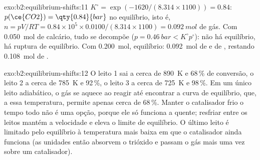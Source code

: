 \begin{solution}{exo:b2:equilibrium-shifts:11}
$K^\circ = \exp(-1620/(8.314 \times 1100)) = 0.84$: $p(\ce{CO2}) =
\qty{0.84}{bar}$ no equilíbrio, isto é, $n = pV/RT = 0.84 \times 10^5 \times
0.0100/(8.314 \times 1100) = \qty{0.092}{mol}$ de gás. Com \qty{0.050}{mol}
de calcário, tudo se decompõe ($p = \qty{0.46}{bar} < K^\circ p^\circ$):
não há equilíbrio, há ruptura de equilíbrio. Com \qty{0.200}{mol}, equilíbrio:
\qty{0.092}{mol} de  e de , restando \qty{0.108}{mol} de .
\end{solution}

\begin{solution}{exo:b2:equilibrium-shifts:12}
O leito 1 sai a cerca de \qty{890}{K} e 68\,\% de conversão, o leito 2 a cerca de
\qty{785}{K} e 92\,\%, o leito 3 a cerca de \qty{725}{K} e 98\,\%. Em um único
leito adiabático, o gás se aquece ao reagir até encontrar a curva de
equilíbrio, que, a essa temperatura, permite apenas cerca de 68\,\%. Manter o
catalisador frio o tempo todo não é uma opção, porque ele só funciona a
quente; resfriar entre os leitos mantém a velocidade e eleva o limite de
equilíbrio. O último leito é limitado pelo equilíbrio à temperatura mais baixa
em que o catalisador ainda funciona (as unidades então absorvem o trióxido e
passam o gás mais uma vez sobre um catalisador).
\end{solution}

